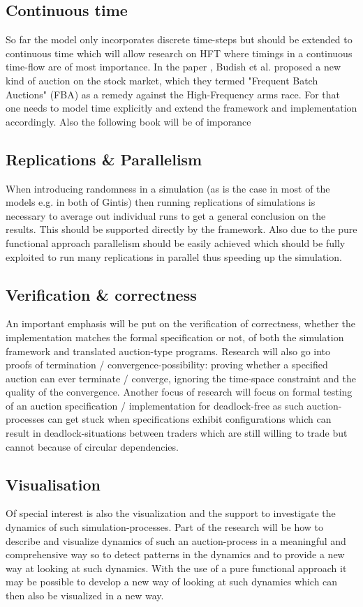 \documentclass{article}
\begin{document}
\subsection{Continuous time}
So far the model only incorporates discrete time-steps but should be extended to continuous time which will allow research on HFT where timings in a continuous time-flow are of most importance. In the paper \cite{Budish2015}, Budish et al. proposed a new kind of auction on the stock market, which they termed "Frequent Batch Auctions" (FBA) as a remedy against the High-Frequency arms race. For that one needs to model time explicitly and extend the framework and implementation accordingly. Also the following book will be of imporance \cite{aldridge_high_frequency_2009}

\subsection{Replications \& Parallelism}
When introducing randomness in a simulation (as is the case in most of the models e.g. in both of Gintis) then running replications of simulations is necessary to average out individual runs to get a general conclusion on the results. This should be supported directly by the framework. Also due to the pure functional approach parallelism should be easily achieved which should be fully exploited to run many replications in parallel thus speeding up the simulation.

\subsection{Verification \& correctness}
An important emphasis will be put on the verification of correctness, whether the implementation matches the formal specification or not, of both the simulation framework and translated auction-type programs. Research will also go into proofs of termination / convergence-possibility: proving whether a specified auction can ever terminate / converge, ignoring the time-space constraint and the quality of the convergence. Another focus of research will focus on formal testing of an auction specification / implementation for deadlock-free as such auction-processes can get stuck when specifications exhibit configurations which can result in deadlock-situations between traders which are still willing to trade but cannot because of circular dependencies.

\subsection{Visualisation}
Of special interest is also the visualization and the support to investigate the dynamics of such simulation-processes. Part of the research will be how to describe and visualize dynamics of such an auction-process in a meaningful and comprehensive way so to detect patterns in the dynamics and to provide a new way at looking at such dynamics. With the use of a pure functional approach it may be possible to develop a new way of looking at such dynamics which can then also be visualized in a new way.
\end{document}
